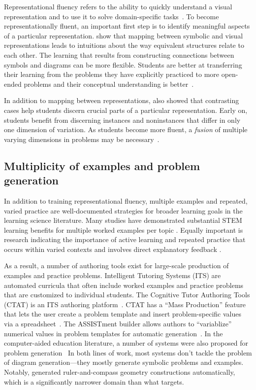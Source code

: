 Representational fluency refers to the ability to quickly understand a visual representation and to use it to solve domain-specific tasks~\cite{multipleReps}. To become representationally fluent, an important first step is to identify meaningful aspects of a particular representation. \citet{perceptualLearning} show that mapping between symbolic and visual representations leads to intuitions about the way equivalent structures relate to each other. The learning that results from constructing connections between symbols and diagrams can be more flexible. Students are better at transferring their learning from the problems they have explicitly practiced to more open-ended problems and their conceptual understanding is better~\cite{25learning}. 

In addition to mapping between representations, \citet{samenessAndDifference} also showed that contrasting cases help students discern crucial parts of a particular representation. Early on, students benefit from discerning instances and noninstances that differ in only one dimension of variation. As students become more fluent, a \emph{fusion} of multiple varying dimensions in problems may be necessary~\cite{fusion}.

\subsection{Multiplicity of examples and problem generation}

In addition to training representational fluency, multiple examples and repeated, varied practice are well-documented strategies for broader learning goals in the learning science literature. Many studies have demonstrated substantial STEM learning benefits for multiple worked examples per topic \cite{PBB07}. Equally important is research indicating the importance of active learning \cite{CW14, DMM19} and repeated practice \cite{deliberatePractice, SSL98} that occurs within varied contexts \cite{PV94, RT07} and involves direct explanatory feedback \cite{perceptualLearning}.

As a result, a number of authoring tools exist for large-scale production of examples and practice problems. Intelligent Tutoring Systems (ITS) are automated curricula that often include worked examples and practice problems that are customized to individual students. The Cognitive Tutor Authoring Tools (CTAT) is an ITS authoring platform~\cite{CTAT}. CTAT has a ``Mass Production'' feature that lets the user create a problem template and insert problem-specific values via a spreadsheet~\cite{massProduction}. The ASSISTment builder allows authors to ``variablize” numerical values in problem templates for automatic generation~\cite{ASSISTment}. In the computer-aided education literature, a number of systems were also proposed for problem generation~\cite{compEduCACM, synthDeduction, synthGeometry} In both lines of work, most systems don’t tackle the problem of diagram generation—they mostly generate symbolic problems and examples. Notably, \citet{synthGeometry} generated ruler-and-compass geometry constructions automatically, which is a significantly narrower domain than what \Edgeworth targets. 

